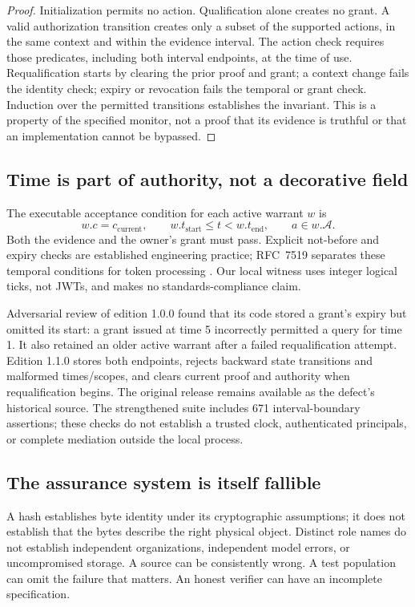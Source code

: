 \begin{proof}
Initialization permits no action. Qualification alone creates no grant. A valid authorization transition creates only a subset of the supported actions, in the same context and within the evidence interval. The action check requires those predicates, including both interval endpoints, at the time of use. Requalification starts by clearing the prior proof and grant; a context change fails the identity check; expiry or revocation fails the temporal or grant check. Induction over the permitted transitions establishes the invariant. This is a property of the specified monitor, not a proof that its evidence is truthful or that an implementation cannot be bypassed.
\end{proof}

\subsection{Time is part of authority, not a decorative field}
The executable acceptance condition for each active warrant $w$ is
\begin{equation}
 w.c=c_{\mathrm{current}},\qquad
 w.t_{\mathrm{start}}\leq t<w.t_{\mathrm{end}},\qquad
 a\in w.\mathcal A.
\end{equation}
Both the evidence and the owner's grant must pass. Explicit not-before and expiry checks are established engineering practice; RFC~7519 separates these temporal conditions for token processing \citep{jwt}. Our local witness uses integer logical ticks, not JWTs, and makes no standards-compliance claim.

Adversarial review of edition 1.0.0 found that its code stored a grant's expiry but omitted its start: a grant issued at time 5 incorrectly permitted a query for time 1. It also retained an older active warrant after a failed requalification attempt. Edition 1.1.0 stores both endpoints, rejects backward state transitions and malformed times/scopes, and clears current proof and authority when requalification begins. The original release remains available as the defect's historical source. The strengthened suite includes 671 interval-boundary assertions; these checks do not establish a trusted clock, authenticated principals, or complete mediation outside the local process.

\subsection{The assurance system is itself fallible}
A hash establishes byte identity under its cryptographic assumptions; it does not establish that the bytes describe the right physical object. Distinct role names do not establish independent organizations, independent model errors, or uncompromised storage. A source can be consistently wrong. A test population can omit the failure that matters. An honest verifier can have an incomplete specification.

